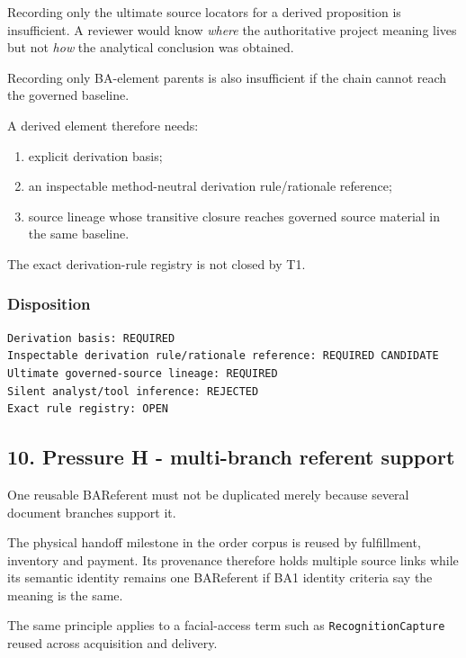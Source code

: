 \documentclass[11pt,a4paper]{article}
\providecommand{\tightlist}{\setlength{\itemsep}{0pt}\setlength{\parskip}{0pt}}
\begin{document}
Recording only the ultimate source locators for a derived proposition is insufficient. A reviewer would know \emph{where} the authoritative project meaning lives but not \emph{how} the analytical conclusion was obtained.

Recording only BA-element parents is also insufficient if the chain cannot reach the governed baseline.

A derived element therefore needs:

\begin{enumerate}
\def\labelenumi{\arabic{enumi}.}
\tightlist
\item
  explicit derivation basis;
\item
  an inspectable method-neutral derivation rule/rationale reference;
\item
  source lineage whose transitive closure reaches governed source material in the same baseline.
\end{enumerate}

The exact derivation-rule registry is not closed by T1.

\subsubsection{Disposition}\label{disposition-6}

\begin{verbatim}
Derivation basis: REQUIRED
Inspectable derivation rule/rationale reference: REQUIRED CANDIDATE
Ultimate governed-source lineage: REQUIRED
Silent analyst/tool inference: REJECTED
Exact rule registry: OPEN
\end{verbatim}

\subsection{10. Pressure H - multi-branch referent support}\label{10-pressure-h---multi-branch-referent-support}

One reusable BAReferent must not be duplicated merely because several document branches support it.

The physical handoff milestone in the order corpus is reused by fulfillment, inventory and payment. Its provenance therefore holds multiple source links while its semantic identity remains one BAReferent if BA1 identity criteria say the meaning is the same.

The same principle applies to a facial-access term such as \texttt{RecognitionCapture} reused across acquisition and delivery.
\end{document}
